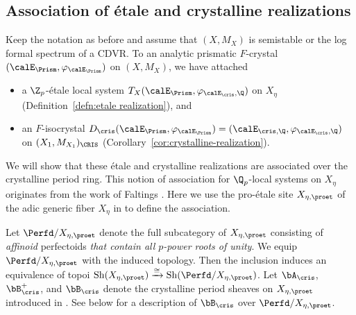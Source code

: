 \subsection{Association of \'etale and crystalline realizations}\label{subsec: etale-cris-association}
Keep the notation as before and assume that $(X,M_X)$ is semistable or the log formal spectrum of a CDVR. To an analytic prismatic $F$-crystal $(\calE_\Prism,\varphi_{\calE_\Prism})$ on $(X,M_X)$, we have attached
\begin{itemize}
    \item a $\Z_p$-\'etale local system $T_X(\calE_\Prism,\varphi_{\calE_{\cris},\Q})$ on $X_\eta$ (Definition~\ref{defn:etale realization}), and
    \item an $F$-isocrystal $D_\cris(\calE_\Prism,\varphi_{\calE_\Prism})=(\calE_{\cris,\Q},\varphi_{\calE_{\cris},\Q})$ on $(X_1,M_{X_1})_{\CRIS}$ (Corollary~\ref{cor:crystalline-realization}).
\end{itemize}
We will show that these \'etale and crystalline realizations are associated over the crystalline period ring. This notion of association for $\Q_p$-local systems on $X_\eta$ originates from the work of Faltings \cite[V.f)]{Faltings-CryscohandGalrep}. Here we use the pro-\'etale site $X_{\eta,\proet}$ of the adic generic fiber $X_\eta$ in \cite{scholze-p-adic-hodge} to define the association. 

Let $\Perfd/X_{\eta,\proet}$ denote the full subcategory of $X_{\eta,\proet}$ consisting of \emph{affinoid} perfectoids \emph{that contain all $p$-power roots of unity}. We equip $\Perfd/X_{\eta,\proet}$ with the induced topology. Then the inclusion induces an equivalence of topoi $\operatorname{Sh}(X_{\eta,\proet})\xrightarrow{\cong}\operatorname{Sh}(\Perfd/X_{\eta,\proet})$.
Let $\bA_\cris$, $\bB_\cris^+$, and $\bB_\cris$ denote the crystalline period sheaves on $X_{\eta,\proet}$ introduced in \cite[\S2A]{Tan-Tong}. See below for a description of $\bB_\cris$ over $\Perfd/X_{\eta,\proet}$.

